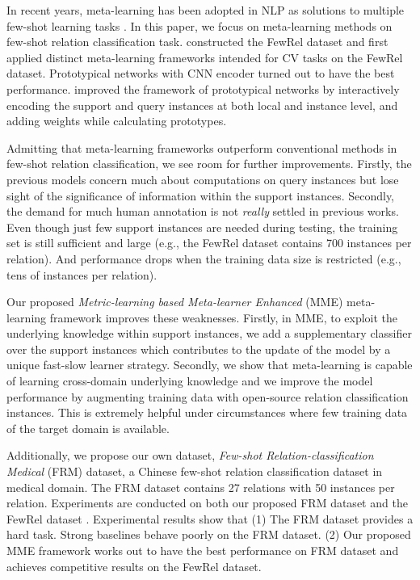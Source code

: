 In recent years, meta-learning has been adopted in NLP as solutions to multiple few-shot learning tasks \citep{gu-etal-2018-meta, han-etal-2018-fewrel, huang-etal-2018-natural, obamuyide-vlachos-2019-meta, ye-ling-2019-multi}. In this paper, we focus on meta-learning methods on few-shot relation classification task.
 \citet{han-etal-2018-fewrel} constructed the FewRel dataset and first applied distinct meta-learning frameworks intended for CV tasks on the FewRel dataset. Prototypical networks \citep{proto} with CNN encoder turned out to have the best performance. \citet{ye-ling-2019-multi} improved the framework of prototypical networks by interactively encoding the support and query instances at both local and instance level, and adding weights while calculating prototypes.

Admitting that meta-learning frameworks outperform conventional methods in few-shot relation classification, we see room for further improvements.
Firstly, the previous models concern much about
computations on query instances but lose sight of the significance of information within the support instances. Secondly, the demand for much human annotation is not \emph{really} settled in previous works. Even though just few support instances are needed during testing, the training set is still sufficient and large (e.g., the FewRel dataset \citep{han-etal-2018-fewrel} contains 700 instances per relation). And performance drops when the training data size is restricted (e.g., tens of instances per relation).

Our proposed
\emph{Metric-learning based Meta-learner Enhanced} (MME) meta-learning framework improves these weaknesses. Firstly, in MME, to exploit the underlying knowledge within support instances, we add a supplementary classifier over the support instances which contributes to the update of the model by a unique fast-slow learner strategy. Secondly, we show that meta-learning is capable of learning cross-domain underlying knowledge and we improve the model performance by augmenting training data with open-source relation classification instances. This is extremely helpful under circumstances where few training data of the target domain is available.

Additionally, we propose our own dataset, \emph{Few-shot Relation-classification Medical} (FRM) dataset, a Chinese few-shot relation classification dataset in medical domain. The FRM dataset contains 27 relations with 50 instances per relation. Experiments are conducted on both our proposed FRM dataset and the FewRel dataset \citep{han-etal-2018-fewrel}. Experimental results show that (1)
The FRM dataset provides a hard task. Strong baselines behave poorly on the FRM dataset. (2) Our proposed MME framework works out to have the best performance on FRM dataset and achieves competitive results on the FewRel dataset.

